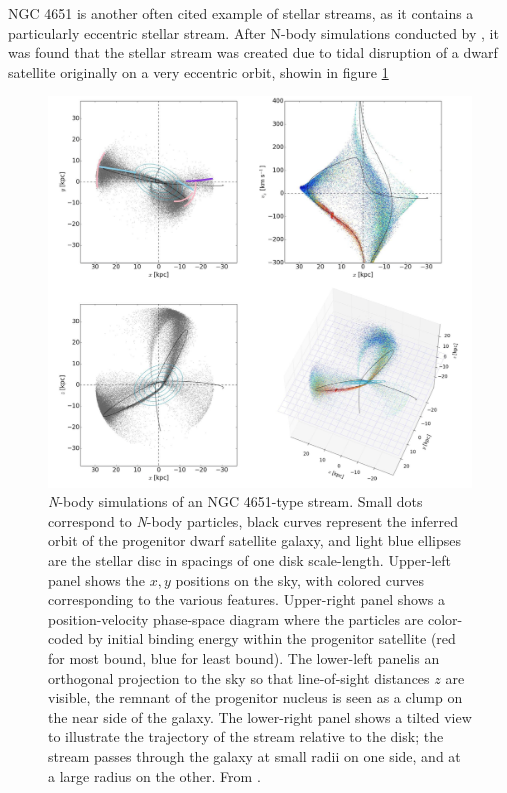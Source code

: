 \documentclass[twocolumn]{article}
\begin{document}
NGC 4651 is another often cited example of stellar streams, as it contains a particularly eccentric stellar stream. After N-body simulations conducted by \cite{foster}, it was found that the stellar stream was created due to tidal disruption of a dwarf satellite originally on a very eccentric orbit, showin in figure \ref{fig:ngc4651}


\begin{figure}
	\includegraphics[width=\textwidth]{nbody-umbrella.png}
	\caption{\textit{N}-body simulations of an NGC 4651-type stream. Small dots correspond to \textit{N}-body particles, black curves represent the inferred orbit of the progenitor dwarf satellite galaxy, and light blue ellipses are the stellar disc in spacings of one disk scale-length. Upper-left panel shows the $x, y$ positions on the sky, with colored curves corresponding to the various features. Upper-right panel shows a position-velocity phase-space diagram where the particles are color-coded by initial binding energy within the progenitor satellite (red for most bound, blue for least bound). The lower-left panelis an orthogonal projection to the sky so that line-of-sight distances $z$ are visible, the remnant of the progenitor nucleus is seen as a clump on the near side of the galaxy. The lower-right panel shows a tilted view to illustrate the trajectory of the stream relative to the disk; the stream passes through the galaxy at small radii on one side, and at a large radius on the other. From \cite{foster}. 
	\label{fig:ngc4651}
	}
\end{figure}
\end{document}
